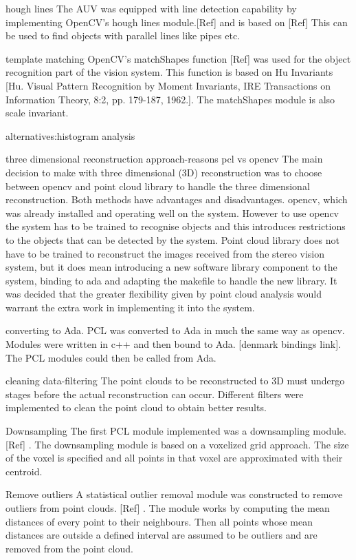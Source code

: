 hough lines
The AUV was equipped with line detection capability by implementing OpenCV’s hough lines module.[Ref]  and is based on [Ref] This can be used to find objects with parallel lines like pipes etc.

template matching
OpenCV’s matchShapes function [Ref] was used for the object recognition part of the vision system. This function is based on Hu Invariants [Hu. Visual Pattern Recognition by Moment Invariants, IRE Transactions on Information Theory, 8:2, pp. 179-187, 1962.]. The matchShapes module is also scale invariant.

alternatives:histogram analysis

three dimensional reconstruction
approach-reasons
pcl vs opencv
The main decision to make with three dimensional (3D) reconstruction was to choose between opencv and point cloud library to handle the three dimensional reconstruction. Both methods have advantages and disadvantages. opencv, which was already installed and operating well on the system. However to use opencv the system has to be trained to recognise objects and this introduces restrictions to the objects that can be detected by the system.
Point cloud library does not have to be trained to reconstruct the images received from the stereo vision system, but it does mean introducing a new software library component to the system, binding to ada and adapting the makefile to handle the new library.
It was decided that the greater flexibility given by point cloud analysis would warrant the extra work in implementing it into the system.

converting to Ada.
PCL was converted to Ada in much the same way as opencv. Modules were written in c++ and then bound to Ada. [denmark bindings link]. The PCL modules could then be called from Ada.

cleaning data-filtering
The point clouds to be reconstructed to 3D must undergo stages before the actual reconstruction can occur. Different filters were implemented to clean the point cloud to obtain better results. 

Downsampling
The first PCL module implemented was a downsampling module.[Ref] . The downsampling module is based on a voxelized grid approach. The size of the voxel is specified and all points in that voxel are approximated with their centroid. 

Remove outliers
A statistical outlier removal module was constructed to remove outliers from point clouds. [Ref] . The module works by computing the mean distances of every point to their neighbours. Then all points whose mean distances are outside a defined interval are assumed to be outliers and are removed from the point cloud.



